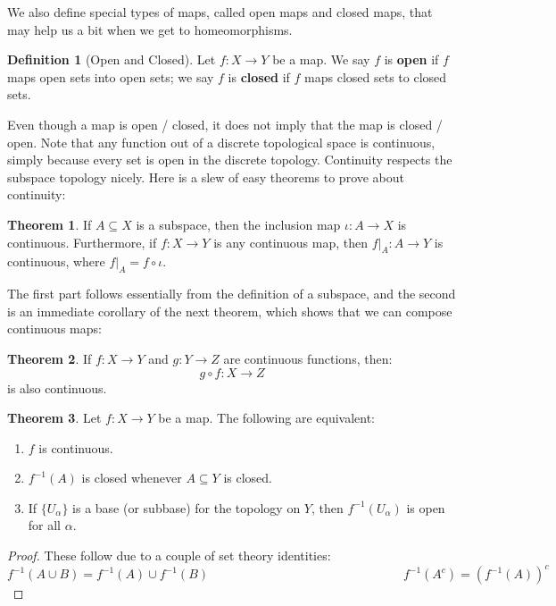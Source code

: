 \documentclass[11pt, oneside]{amsart}   	%
\theoremstyle{definition}
\newtheorem{definition}{Definition}[section]
\newtheorem{theorem}{Theorem}[section]
\begin{document}
	We also define special types of maps, called open maps and closed maps, that may help us a bit when we get to homeomorphisms.
	
	\begin{definition}[Open and Closed]
		Let $f : X\rightarrow Y$ be a map. We say $f$ is \textbf{open} if $f$ maps open sets into open sets; we say $f$ is \textbf{closed} if $f$ maps closed sets 
		to closed sets.
	\end{definition}
	
	Even though a map is open / closed, it does not imply that the map is closed / open. Note that any function out of a discrete topological space is continuous, 
	simply because every set is open in the discrete topology. Continuity respects the subspace topology nicely. Here is a slew of easy theorems to prove about 
	continuity:
	
	\begin{theorem}
		If $A\subseteq X$ is a subspace, then the inclusion map $\iota : A\rightarrow X$ is continuous. Furthermore, if $f : X\rightarrow Y$ is any continuous 
		map, then $f|_A : A\rightarrow Y$ is continuous, where $f|_A = f\circ\iota$.
	\end{theorem}
	
	The first part follows essentially from the definition of a subspace, and the second is an immediate corollary of the next theorem, which shows that we can 
	compose continuous maps:
	
	\begin{theorem}
		If $f : X\rightarrow Y$ and $g : Y\rightarrow Z$ are continuous functions, then:
		$$
			g\circ f : X\rightarrow Z
		$$
		is also continuous.
	\end{theorem}
	
	\begin{theorem}
		Let $f : X\rightarrow Y$ be a map. The following are equivalent:
		\begin{enumerate}
			\item $f$ is continuous. 
			\item $f^{-1}(A)$ is closed whenever $A\subseteq Y$ is closed. 
			\item If $\{U_\alpha\}$ is a base (or subbase) for the topology on $Y$, then $f^{-1}(U_\alpha)$ is open for all $\alpha$.
		\end{enumerate}
	\end{theorem}
	
	\begin{proof}
		These follow due to a couple of set theory identities:
		$$
			f^{-1}(A\cup B) = f^{-1}(A)\cup f^{-1}(B) \;\;\;\;\;\;\;\;\;\;\;\;\;\;\;\;\;\;\;\;\;\;\;\;\;\;\;\;\;\;\;\;\;\;\;\;\;\;\;\;\;\;\;\;\;\;\;\;\;\;\;\;\;\;\;\;
			f^{-1}(A^c) = (f^{-1}(A))^c
		$$
	\end{proof}
	
\end{document}
